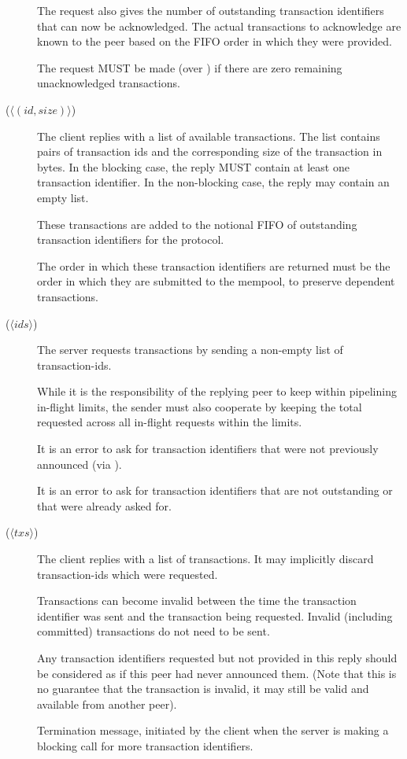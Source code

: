 \begin{description}
      The request also gives the number of outstanding transaction identifiers
      that can now be acknowledged. The actual transactions to acknowledge are
      known to the peer based on the FIFO order in which they were provided.

      The request MUST be made (over \MsgRequestTxIdsNB{}) if there are zero
      remaining unacknowledged transactions.
\item [\MsgReplyTxIds{} {\boldmath ($\langle (id, size) \rangle$) }]
      The client replies with a list of available transactions.
      The list contains pairs of transaction ids and the corresponding size of the transaction in bytes.
      In the blocking case, the reply MUST contain at least one transaction identifier.
      In the non-blocking case, the reply may contain an empty list.

      These transactions are added to the notional FIFO of outstanding
      transaction identifiers for the protocol.

      The order in which these transaction identifiers are returned must be the
      order in which they are submitted to the mempool, to preserve dependent
      transactions.
\item [\MsgRequestTxs{} {\boldmath ($\langle ids \rangle$)}]
      The server requests transactions by sending a non-empty list of transaction-ids.

      While it is the responsibility of the replying peer to keep within
      pipelining in-flight limits, the sender must also cooperate by keeping
      the total requested across all in-flight requests within the limits.

      It is an error to ask for transaction identifiers that were not
      previously announced (via \MsgReplyTxIds{}).

      It is an error to ask for transaction identifiers that are not
      outstanding or that were already asked for.
\item [\MsgReplyTxs{} {\boldmath ($\langle txs \rangle$})]
      The client replies with a list of transactions.  It may implicitly
      discard transaction-ids which were requested.

      Transactions can become invalid between the time the transaction
      identifier was sent and the transaction being requested. Invalid
      (including committed) transactions do not need to be sent.

      Any transaction identifiers requested but not provided in this reply
      should be considered as if this peer had never announced them. (Note
      that this is no guarantee that the transaction is invalid, it may still
      be valid and available from another peer).
\item [\MsgDone]
      Termination message, initiated by the client when the server is making
      a blocking call for more transaction identifiers.
\end{description}

